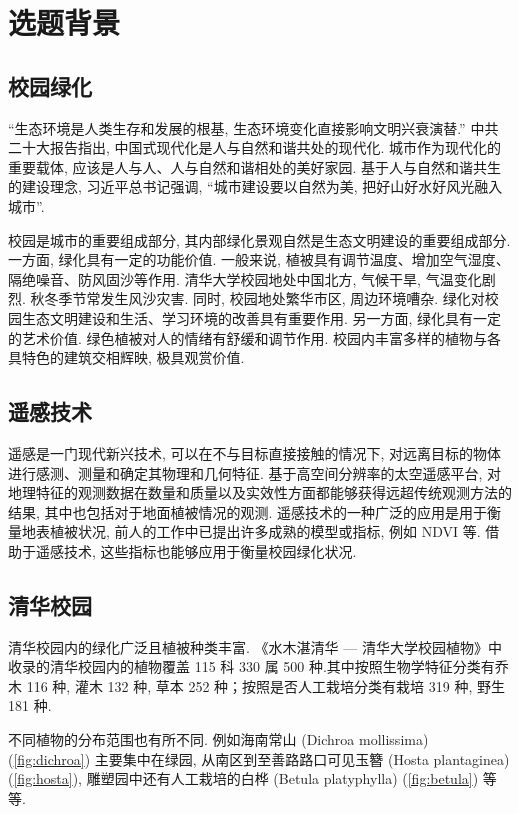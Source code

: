 
\section{选题背景}

\subsection{校园绿化}

``生态环境是人类生存和发展的根基, 生态环境变化直接影响文明兴衰演替.''\cite{__2019}
中共二十大报告指出, 中国式现代化是人与自然和谐共处的现代化.
城市作为现代化的重要载体, 应该是人与人、人与自然和谐相处的美好家园.
基于人与自然和谐共生的建设理念, 习近平总书记强调, ``城市建设要以自然为美, 把好山好水好风光融入城市''.\cite{__2022}

校园是城市的重要组成部分, 其内部绿化景观自然是生态文明建设的重要组成部分.
一方面, 绿化具有一定的功能价值.
一般来说, 植被具有调节温度、增加空气湿度、隔绝噪音、防风固沙等作用.\cite{__2022-1}
清华大学校园地处中国北方, 气候干旱, 气温变化剧烈.
秋冬季节常发生风沙灾害.
同时, 校园地处繁华市区, 周边环境嘈杂.
绿化对校园生态文明建设和生活、学习环境的改善具有重要作用.
另一方面, 绿化具有一定的艺术价值.
绿色植被对人的情绪有舒缓和调节作用.
校园内丰富多样的植物与各具特色的建筑交相辉映, 极具观赏价值.

\subsection{遥感技术}

遥感是一门现代新兴技术, 可以在不与目标直接接触的情况下, 对远离目标的物体进行感测、测量和确定其物理和几何特征.
基于高空间分辨率的太空遥感平台, 对地理特征的观测数据在数量和质量以及实效性方面都能够获得远超传统观测方法的结果, 其中也包括对于地面植被情况的观测.
遥感技术的一种广泛的应用是用于衡量地表植被状况, 前人的工作中已提出许多成熟的模型或指标, 例如 NDVI 等.
借助于遥感技术, 这些指标也能够应用于衡量校园绿化状况.

\subsection{清华校园}

清华校园内的绿化广泛且植被种类丰富.
《水木湛清华 --- 清华大学校园植物》中收录的清华校园内的植物覆盖 115 科 330 属 500 种.其中按照生物学特征分类有乔木 116 种, 灌木 132 种, 草本 252 种；按照是否人工栽培分类有栽培 319 种, 野生 181 种.

不同植物的分布范围也有所不同.
例如海南常山 (Dichroa mollissima) (\cref{fig:dichroa}) 主要集中在绿园, 从南区到至善路路口可见玉簪 (Hosta plantaginea) (\cref{fig:hosta}), 雕塑园中还有人工栽培的白桦 (Betula platyphylla) (\cref{fig:betula}) 等等.

